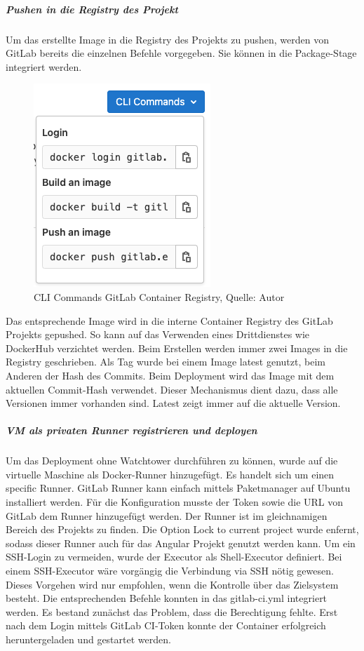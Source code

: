 \newpage
\subparagraph{Pushen in die Registry des Projekt}
Um das erstellte Image in die Registry des Projekts zu pushen, werden von GitLab bereits die einzelnen Befehle vorgegeben. Sie können in die Package-Stage integriert werden. 
\begin{figure}[H]
	\centering
	\includegraphics[scale=0.5]{images/gitLabRegistry.png}
	\caption[CLI Commands GitLab Container Registry]{CLI Commands GitLab Container Registry, Quelle: Autor}
\label{img: containerRegistryGitlab}
\end{figure}

Das entsprechende Image wird in die interne Container Registry des \gls{GitLab} Projekts gepushed. So kann auf das Verwenden eines Drittdienstes wie \gls{DockerHub} verzichtet werden. 
Beim Erstellen werden immer zwei Images in die Registry geschrieben. Als Tag wurde bei einem Image latest genutzt, beim Anderen der Hash des Commits. Beim Deployment wird das Image mit dem aktuellen Commit-Hash verwendet. Dieser Mechanismus dient dazu, dass alle Versionen immer vorhanden sind. Latest zeigt immer auf die aktuelle Version. 

\subparagraph{VM als privaten Runner registrieren und deployen}
Um das Deployment ohne Watchtower durchführen zu können, wurde auf die virtuelle Maschine als Docker-Runner hinzugefügt. Es handelt sich um einen specific Runner. 
\gls{GitLab} Runner kann einfach mittels Paketmanager auf Ubuntu installiert werden. Für die Konfiguration musste der Token sowie die URL von \gls{GitLab} dem Runner hinzugefügt werden. Der Runner ist im gleichnamigen Bereich des Projekts zu finden. Die Option \glqq Lock to current project\grqq{} wurde enfernt, sodass dieser Runner auch für das Angular Projekt genutzt werden kann. 
Um ein SSH-Login zu vermeiden, wurde der Executor als Shell-Executor definiert. Bei einem SSH-Executor wäre vorgängig die Verbindung via SSH nötig gewesen. Dieses Vorgehen wird nur empfohlen, wenn die Kontrolle über das Zielsystem besteht. 
Die entsprechenden Befehle konnten in das gitlab-ci.yml integriert werden. Es bestand zunächst das Problem, dass die Berechtigung fehlte. Erst nach dem Login mittels GitLab CI-Token konnte der Container erfolgreich heruntergeladen und gestartet werden. 

